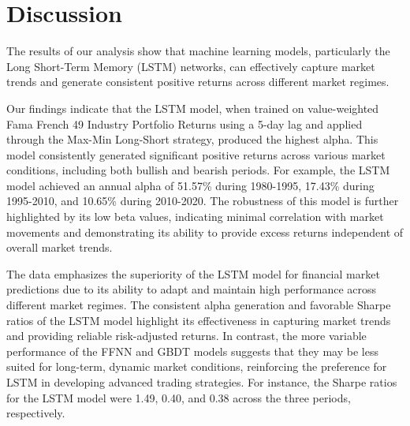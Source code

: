 \documentclass{article}
\begin{document}
\medskip

\section{Discussion}
The results of our analysis show that machine learning models, particularly the Long Short-Term Memory (LSTM) networks, can effectively capture market trends and generate consistent positive returns across different market regimes.



Our findings indicate that the LSTM model, when trained on value-weighted Fama French 49 Industry Portfolio Returns using a 5-day lag and applied through the Max-Min Long-Short strategy, produced the highest alpha. This model consistently generated significant positive returns across various market conditions, including both bullish and bearish periods. For example, the LSTM model achieved an annual alpha of 51.57\% during 1980-1995, 17.43\% during 1995-2010, and 10.65\% during 2010-2020. The robustness of this model is further highlighted by its low beta values, indicating minimal correlation with market movements and demonstrating its ability to provide excess returns independent of overall market trends.

The data emphasizes the superiority of the LSTM model for financial market predictions due to its ability to adapt and maintain high performance across different market regimes. The consistent alpha generation and favorable Sharpe ratios of the LSTM model highlight its effectiveness in capturing market trends and providing reliable risk-adjusted returns. In contrast, the more variable performance of the FFNN and GBDT models suggests that they may be less suited for long-term, dynamic market conditions, reinforcing the preference for LSTM in developing advanced trading strategies. For instance, the Sharpe ratios for the LSTM model were 1.49, 0.40, and 0.38 across the three periods, respectively.
\end{document}
